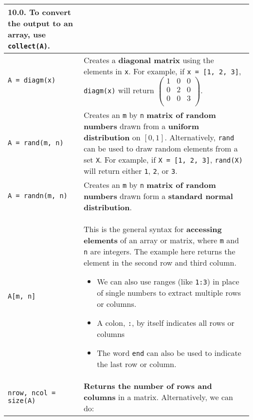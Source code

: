 \documentclass[]{article}
\begin{document}
\begin{longtable}{ |m{6cm}  | m{11cm} |}
{    10.0}. To convert the 
    output to an array, use \texttt{collect(A)}.	
    \\\hline
\begin{verbatim}
A = diagm(x)
\end{verbatim}
& Creates a \textbf{diagonal matrix} using the elements in \texttt{x}.  For example, if
\texttt{x = [1, 2, 3]}, \texttt{diagm(x)} will return
$\begin{pmatrix}
1 & 0 & 0\\
0 & 2 & 0\\
0 & 0 & 3\\
\end{pmatrix}$.
\\\hline
\begin{verbatim}
A = rand(m, n)
\end{verbatim}
& Creates an \texttt{m} by \texttt{n} \textbf{matrix of random numbers} drawn from a
\textbf{uniform distribution} on $[0, 1]$. Alternatively, \texttt{rand} can be used to
draw random elements from a set \texttt{X}. For example, if \texttt{X = [1, 2,
3]}, \texttt{rand(X)} will return either \texttt{1}, \texttt{2}, or \texttt{3}.
\\\hline
\begin{verbatim}
A = randn(m, n)
\end{verbatim}
& Creates an \texttt{m} by \texttt{n} \textbf{matrix of random numbers} drawn form a
\textbf{standard normal distribution}.\\\hline
\begin{verbatim}
A[m, n]
\end{verbatim}
	& This is the general syntax for \textbf{accessing elements} of an array or matrix, where \texttt{m} and \texttt{n} are integers. The example here returns the element in the second row and third column. 
	\begin{itemize}
	\item We can also use ranges (like \texttt{1:3}) in place of single numbers to extract multiple rows or columns. 
	\item A colon, \texttt{:}, by itself indicates all rows or columns
	\item The word \texttt{end} can also be used to indicate the last row or column.
	\end{itemize}
	\\\hline
\begin{verbatim}
nrow, ncol = size(A)
\end{verbatim}
	& \textbf{Returns the number of rows and columns} in a matrix. Alternatively, we can do:

\end{longtable}
\end{document}

